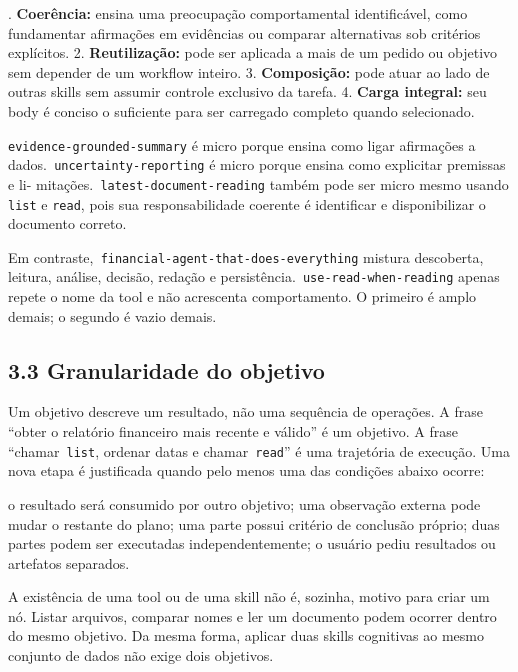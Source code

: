 \documentclass[12pt,a4paper]{article}
\begin{document}
.\textbf{ Coerência:} ensina uma preocupação comportamental identificável, como fundamentar afirmações em evidências ou comparar alternativas sob critérios explícitos. 2.\textbf{ Reutilização:} pode ser aplicada a mais de um pedido ou objetivo sem depender de um workflow inteiro. 3.\textbf{ Composição:} pode atuar ao lado de outras skills sem assumir controle exclusivo da tarefa. 4.\textbf{ Carga integral:} seu body é conciso o suficiente para ser carregado completo quando selecionado.\par

\texttt{evidence-grounded-summary} é micro porque ensina como ligar afirmações a dados.\texttt{ uncertainty-reporting} é micro porque ensina como explicitar premissas e li- mitações.\texttt{ latest-document-reading} também pode ser micro mesmo usando\texttt{ list} e \texttt{read}, pois sua responsabilidade coerente é identificar e disponibilizar o documento correto.


Em contraste,\texttt{ financial-agent-that-does-everything} mistura descoberta, leitura, análise, decisão, redação e persistência.\texttt{ use-read-when-reading} apenas repete o nome da tool e não acrescenta comportamento. O primeiro é amplo demais; o segundo é vazio demais.


\subsection*{3.3 Granularidade do objetivo}

Um objetivo descreve um resultado, não uma sequência de operações. A frase “obter o relatório financeiro mais recente e válido” é um objetivo. A frase “chamar\texttt{ list}, ordenar datas e chamar\texttt{ read}” é uma trajetória de execução. Uma nova etapa é justificada quando pelo menos uma das condições abaixo ocorre:


\noindent \textbullet{} o resultado será consumido por outro objetivo; \textbullet{} uma observação externa pode mudar o restante do plano; \textbullet{} uma parte possui critério de conclusão próprio; \textbullet{} duas partes podem ser executadas independentemente; \textbullet{} o usuário pediu resultados ou artefatos separados.\par

A existência de uma tool ou de uma skill não é, sozinha, motivo para criar um nó. Listar arquivos, comparar nomes e ler um documento podem ocorrer dentro do mesmo objetivo. Da mesma forma, aplicar duas skills cognitivas ao mesmo conjunto de dados não exige dois objetivos.
\end{document}
